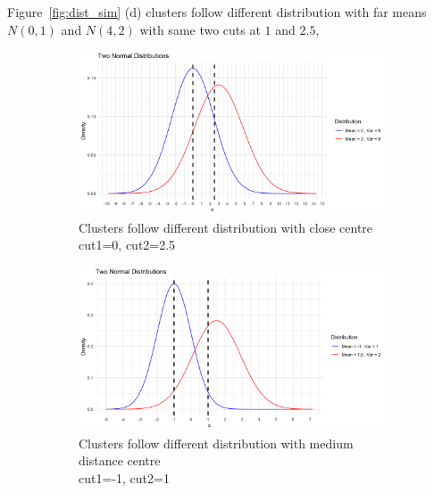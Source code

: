 \documentclass{article}
\begin{document}
Figure~\ref*{fig:dist_sim} (d) clusters follow different distribution with far means $N(0,1)$ and $N(4,2)$
with same two cuts at $1$ and $2.5$,

\begin{figure}[htbp!]
  \centering
  \begin{subfigure}{0.32\textwidth}  %
    \centering
    \includegraphics[width=\textwidth]{images/dist_simu/nor_close.png} %
    \caption{Clusters follow different distribution with close centre\\ cut1=0, cut2=2.5}
\end{subfigure}
  \hfill
  \begin{subfigure}{0.32\textwidth}  %
    \centering
    \includegraphics[width=\textwidth]{images/dist_simu/nor.png} %
    \caption{Clusters follow different distribution with medium distance centre\\ cut1=-1, cut2=1}
\end{subfigure}
  \hfill
  \begin{subfigure}{0.32\textwidth}  %

\end{subfigure}
\end{figure}
\end{document}
